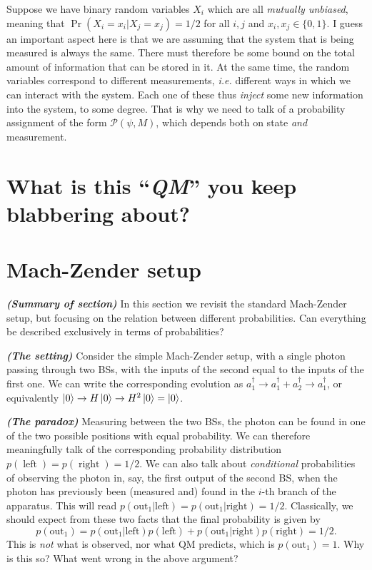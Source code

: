 \documentclass[12pt]{report}
\newcommand{\on}[1]{\operatorname{#1}}
\newcommand{\calP}{{\mathcal{P}}}
\newcommand{\heading}[1]{\textbf{\color{orange}\textit{(#1)}}}
\begin{document}
Suppose we have binary random variables $X_i$ which are all \emph{mutually unbiased}, meaning that $\Pr(X_i=x_i|X_j=x_j)=1/2$ for all $i,j$ and $x_i,x_j\in\{0,1\}$. I guess an important aspect here is that we are assuming that the system that is being measured is always the same. There must therefore be some bound on the total amount of information that can be stored in it.
At the same time, the random variables correspond to different measurements, \emph{i.e.} different ways in which we can interact with the system. Each one of these thus \emph{inject} some new information into the system, to some degree.
That is why we need to talk of a probability assignment of the form $\calP(\psi,M)$, which depends both on state \emph{and} measurement.

\section{What is this ``\emph{QM}'' you keep blabbering about?}

\section{Mach-Zender setup}

\heading{Summary of section}
In this section we revisit the standard Mach-Zender setup, but focusing on the relation between different probabilities.
Can everything be described exclusively in terms of probabilities?

\heading{The setting}
Consider the simple Mach-Zender setup, with a single photon passing through two BSs, with the inputs of the second equal to the inputs of the first one. We can write the corresponding evolution as
$a_1^\dagger\to a_1^\dagger + a_2^\dagger \to a_1^\dagger$, or equivalently $\ket0\to H\ket0\to H^2\ket0=\ket0$.

\heading{The paradox}
Measuring between the two BSs, the photon can be found in one of the two possible positions with equal probability. We can therefore meaningfully talk of the corresponding probability distribution $p(\on{left})=p(\on{right})=1/2$.
We can also talk about \emph{conditional} probabilities of observing the photon in, say, the first output of the second BS, when the photon has previously been (measured and) found in the $i$-th branch of the apparatus.
This will read $p(\text{out}_1|\text{left})=p(\text{out}_1|\text{right})=1/2$.
Classically, we should expect from these two facts that the final probability is given by
\begin{equation}
	p(\text{out}_1) =
	p(\text{out}_1|\text{left}) p(\text{left})
	+ p(\text{out}_1|\text{right}) p(\text{right}) = 1/2.
	\label{MZ:eq:conditional_probabilities_classical_law}
\end{equation}
This is \emph{not} what is observed, nor what QM predicts, which is $p(\text{out}_1)=1$.
Why is this so? What went wrong in the above argument?
\end{document}
